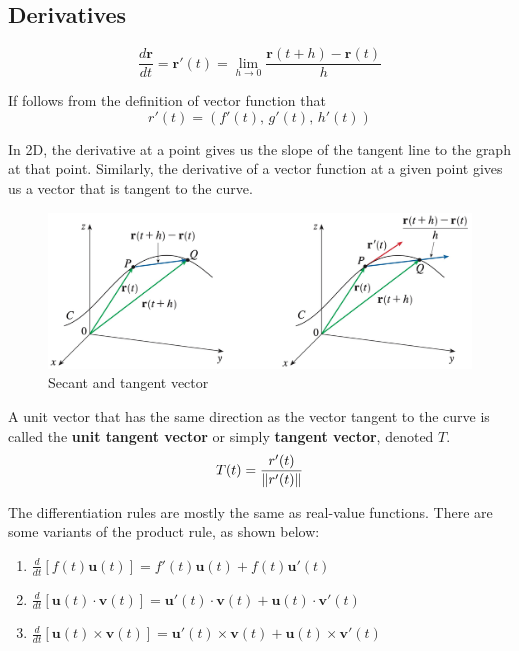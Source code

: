 \subsection{Derivatives}

\begin{definition}
$$
\frac{d\mathbf r}{dt} = \mathbf{r}'(t) = \lim_{h\to0}\frac{\mathbf{r}(t+h)-\mathbf{r}(t)}{h}
$$
\end{definition}

If follows from the definition of vector function that
$$
r'(t)= (f'(t),\, g'(t),\, h'(t))
$$

In 2D, the derivative at a point gives us the slope of the tangent line to the graph at that point. Similarly, the derivative of a vector function at a given point gives us a vector that is tangent to the curve.

\begin{figure}[h]
    \centering
    \includegraphics[width=0.6\linewidth]{figures/tangent-vector.jpeg}
    \caption{Secant and tangent vector}
    \label{fig:tan_vec}
\end{figure}

A unit vector that has the same direction as the vector tangent to the curve is called the {\bf unit tangent vector} or simply {\bf tangent vector}, denoted $T$.
$$
T(t) = \frac{r'(t)}{\lVert r'(t) \rVert}
$$

The differentiation rules are mostly the same as real-value functions. There are some variants of the product rule, as shown below:
\begin{theorem}
\begin{multicols}{2}
    \begin{enumerate}
        \item $\displaystyle\frac{d}{dt}\left[ f(t) \mathbf{u}(t) \right] = f'(t)\mathbf{u}(t) + f(t)\mathbf{u}'(t)$
        \item $\displaystyle\frac{d}{dt}\left[ \mathbf{u}(t) \cdot \mathbf{v}(t) \right] = \mathbf{u}'(t)\cdot\mathbf{v}(t) + \mathbf{u}(t)\cdot\mathbf{v}'(t)$
        \item $\displaystyle\frac{d}{dt}\left[ \mathbf{u}(t) \times \mathbf{v}(t) \right] = \mathbf{u}'(t)\times\mathbf{v}(t) + \mathbf{u}(t)\times\mathbf{v}'(t)$
    \end{enumerate}
\end{multicols}
\end{theorem}

